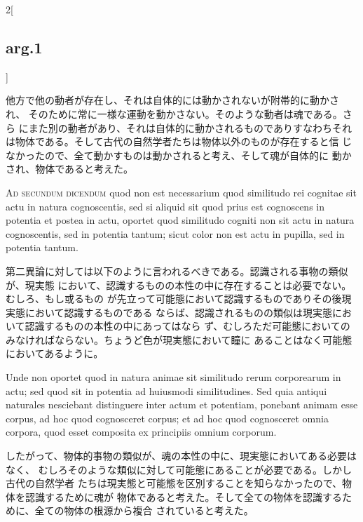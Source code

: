 \documentclass[paper=a4paper,fontsize=10pt,jafontsize=9pt,titlepage]{jlreq}
\begin{document}
\begin{paracol}{2}[\subsection{arg.1}]
\switchcolumn

他方で他の動者が存在し、それは自体的には動かされないが附帯的に動かされ、
そのために常に一様な運動を動かさない。そのような動者は魂である。さら
にまた別の動者があり、それは自体的に動かされるものでありすなわちそれ
は物体である。そして古代の自然学者たちは物体以外のものが存在すると信
じなかったので、全て動かすものは動かされると考え、そして魂が自体的に
動かされ、物体であると考えた。


\switchcolumn*[\subsection{ad 2}]



{\scshape Ad secundum dicendum} quod non est necessarium quod similitudo rei
cognitae sit actu in natura cognoscentis, sed si aliquid sit quod
prius est cognoscens in potentia et postea in actu, oportet quod
similitudo cogniti non sit actu in natura cognoscentis, sed in
potentia tantum; sicut color non est actu in pupilla, sed in potentia
tantum. 

\switchcolumn

第二異論に対しては以下のように言われるべきである。認識される事物の類似が、現実態
において、認識するものの本性の中に存在することは必要でない。むしろ、もし或るもの
が先立って可能態において認識するものでありその後現実態において認識するものである
ならば、認識されるものの類似は現実態において認識するものの本性の中にあってはなら
ず、むしろただ可能態においてのみなければならない。ちょうど色が現実態において瞳に
あることはなく可能態においてあるように。

\switchcolumn*

Unde non oportet quod in natura animae sit similitudo rerum corporearum in actu;
sed quod sit in potentia ad huiusmodi similitudines. Sed quia antiqui naturales
nesciebant distinguere inter actum et potentiam, ponebant animam esse corpus, ad
hoc quod cognosceret corpus; et ad hoc quod cognosceret omnia corpora, quod
esset composita ex principiis omnium corporum.

\switchcolumn

 したがって、物体的事物の類似が、魂の本性の中に、現実態においてある必要はなく、
 むしろそのような類似に対して可能態にあることが必要である。しかし古代の自然学者
 たちは現実態と可能態を区別することを知らなかったので、物体を認識するために魂が
 物体であると考えた。そして全ての物体を認識するために、全ての物体の根源から複合
 されていると考えた。

\switchcolumn*[\subsection{ad 3}]


\end{paracol}
\end{document}
